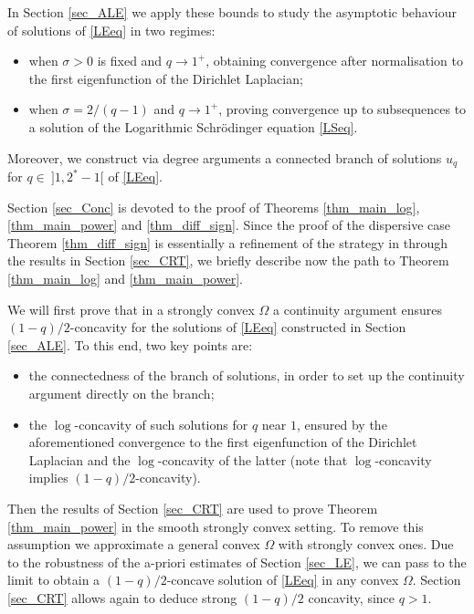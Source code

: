 \documentclass[12pt]{amsart}
\numberwithin{equation}{section}
\theoremstyle{plain}
\theoremstyle{plain}
\theoremstyle{plain}
\theoremstyle{definition}
\begin{document}
\smallskip

In Section \ref{sec_ALE} we apply these bounds to study the asymptotic behaviour of solutions of \eqref{LEeq} in two regimes: 
\begin{itemize}
\item
when $\sigma>0$ is fixed and $q\to 1^+$, obtaining convergence after normalisation to the first eigenfunction of the Dirichlet Laplacian;
\item
when $\sigma=2/(q-1)$ and $q\to 1^+$, proving convergence up to subsequences to a solution of the Logarithmic Schr\"odinger equation \eqref{LSeq}.
\end{itemize}
Moreover, we construct via degree arguments a connected branch of solutions $u_q$ for $q\in \ ]1, 2^*-1[$ of \eqref{LEeq}.

\smallskip

Section \ref{sec_Conc} is devoted to the proof of Theorems \ref{thm_main_log}, \ref{thm_main_power} and \ref{thm_diff_sign}. 
Since the proof of the dispersive case Theorem \ref{thm_diff_sign} is essentially a refinement of the strategy in \cite{BMS22, MRS24} through the results in Section \ref{sec_CRT}, we briefly describe now the path to Theorem \ref{thm_main_log} and \ref{thm_main_power}. 

We will first prove that in a strongly convex $\Omega$ a continuity argument ensures $(1-q)/2$-concavity for the solutions of \eqref{LEeq} constructed in Section \ref{sec_ALE}. 
To this end, two key points are: 
\begin{itemize}
\item
the connectedness of the branch of solutions, in order to set up the continuity argument directly on the branch;
\item
the $\log$-concavity of such solutions for $q$ near $1$, ensured by the aforementioned convergence to the first eigenfunction of the Dirichlet Laplacian and the $\log$-concavity of the latter (note that $\log$-concavity implies $(1-q)/2$-concavity).
\end{itemize}
Then the results of Section \ref{sec_CRT} are used to prove Theorem \ref{thm_main_power} in the smooth strongly convex setting. 
To remove this assumption we approximate a general convex $\Omega$ with strongly convex ones. 
Due to the robustness of the a-priori estimates of Section \ref{sec_LE}, we can pass to the limit to obtain a $(1-q)/2$-concave solution of \eqref{LEeq} in any convex $\Omega$. 
Section \ref{sec_CRT} allows again to deduce strong $(1-q)/2$ concavity, since $q>1$.
\end{document}
